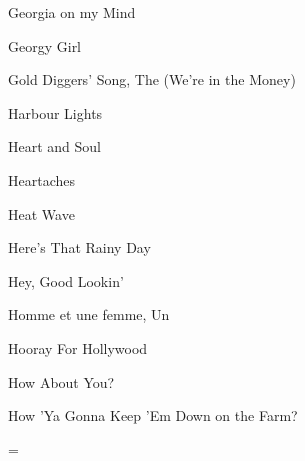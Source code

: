 \M Georgia on my Mind

\M Georgy  Girl

\M Gold Diggers' Song, The (We're in the Money)

\M Harbour Lights

\M Heart and Soul

\M Heartaches

\M Heat Wave

\M Here's That Rainy Day

\M Hey, Good Lookin'

\M Homme et une femme, Un

\M Hooray For Hollywood

\M How About You?

\M How 'Ya Gonna Keep 'Em Down on the Farm?

\singlecolumn
\vfil\eject
\ifseparate
\else
\pagecnt=\pageno
\fi
\endinput

